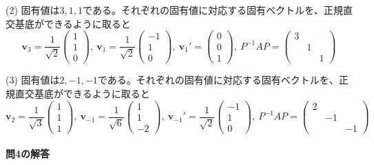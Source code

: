 \noindent (2) 固有値は$3, 1, 1$である。それぞれの固有値に対応する固有ベクトルを、正規直交基底ができるように取ると
\[
\bm{v}_{3} =
\frac{1}{\sqrt{2}}
\begin{pmatrix}
1 \\
1 \\
0
\end{pmatrix}, \ 
\bm{v}_{1} =
\frac{1}{\sqrt{2}}
\begin{pmatrix}
-1 \\
1 \\
0
\end{pmatrix}, \ 
\bm{v}_{1}' =
\begin{pmatrix}
0 \\
0 \\
1
\end{pmatrix}, \ 
P^{-1} A P 
= 
\begin{pmatrix}
3 \\
& 1 \\
& & 1
\end{pmatrix}
\]

\noindent (3) 固有値は$2, -1, -1$である。それぞれの固有値に対応する固有ベクトルを、正規直交基底ができるように取ると %
\[
\bm{v}_{2} =
\frac{1}{\sqrt{3}}
\begin{pmatrix}
1 \\
1 \\
1
\end{pmatrix}, \ 
\bm{v}_{-1} =
\frac{1}{\sqrt{6}}
\begin{pmatrix}
1 \\
1 \\
-2
\end{pmatrix}, \ 
\bm{v}_{-1}' =
\frac{1}{\sqrt{2}}
\begin{pmatrix}
-1 \\
1 \\
0
\end{pmatrix}, \ 
P^{-1} A P 
= 
\begin{pmatrix}
2 \\
& -1 \\
& & -1
\end{pmatrix}
\]

\paragraph{問4の解答}

